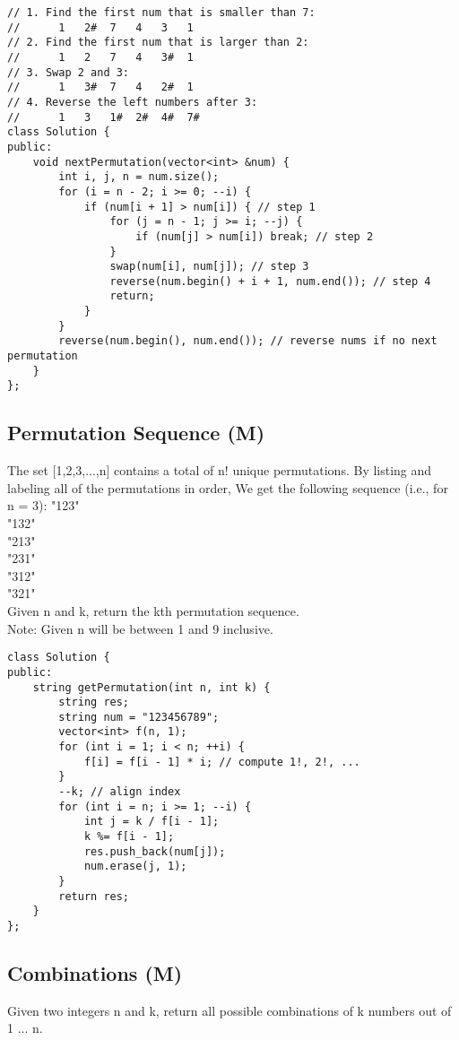 \begin{lstlisting}
// 1. Find the first num that is smaller than 7:
//      1   2#  7   4   3   1
// 2. Find the first num that is larger than 2:
//      1   2   7   4   3#  1
// 3. Swap 2 and 3:
//      1   3#  7   4   2#  1
// 4. Reverse the left numbers after 3: 
//      1   3   1#  2#  4#  7#
class Solution {
public:
    void nextPermutation(vector<int> &num) {
        int i, j, n = num.size();
        for (i = n - 2; i >= 0; --i) {
            if (num[i + 1] > num[i]) { // step 1
                for (j = n - 1; j >= i; --j) {
                    if (num[j] > num[i]) break; // step 2
                }
                swap(num[i], num[j]); // step 3
                reverse(num.begin() + i + 1, num.end()); // step 4
                return;
            }
        }
        reverse(num.begin(), num.end()); // reverse nums if no next permutation
    }
};
\end{lstlisting}


\subsection{Permutation Sequence (M)}
The set [1,2,3,...,n] contains a total of n! unique permutations. By listing and labeling all of the permutations in order, We get the following sequence (i.e., for n = 3):
    "123"\\
    "132"\\
    "213"\\
    "231"\\
    "312"\\
    "321"\\
Given n and k, return the kth permutation sequence.\\
Note: Given n will be between 1 and 9 inclusive.\\

\begin{lstlisting}
class Solution {
public:
    string getPermutation(int n, int k) {
        string res;
        string num = "123456789";
        vector<int> f(n, 1);
        for (int i = 1; i < n; ++i) {
            f[i] = f[i - 1] * i; // compute 1!, 2!, ...
        }
        --k; // align index
        for (int i = n; i >= 1; --i) {
            int j = k / f[i - 1];
            k %= f[i - 1];
            res.push_back(num[j]);
            num.erase(j, 1);
        }
        return res;
    }
};
\end{lstlisting}


\subsection{Combinations (M)}
Given two integers n and k, return all possible combinations of k numbers out of 1 ... n.\\

